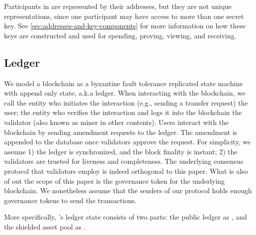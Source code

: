 Participants in \MantaPay{} are represented by their addresses, but they are not unique representations, since one participant may have access to more than one secret key. See \autoref{sec:addresses-and-key-components} for more information on how these keys are constructed and used for spending, proving, viewing, and receiving.

\subsection{Ledger}

We model a blockchain as a byzantine fault tolerance replicated state
machine with append only state, a.k.a ledger. When interacting with the blockchain, we call the entity who
initiates the interaction (e.g., sending a transfer request) the user; the entity who verifies the interaction and
logs it into the blockchain the validator (also known as miner in other contents). Users interact with the
blockchain by sending amendment requests to the ledger. The amendment is appended to the database once
validators approve the request. For simplicity, we assume 1) the ledger is synchronized, and the block finality
is instant; 2) the validators are trusted for liveness and completeness. The underlying consensus protocol
that validators employ is indeed orthogonal to this paper. What is also of out the scope of this paper is
the governance token for the underlying blockchain. We nonetheless assume that the senders of our protocol
holds enough governance tokens to send the transactions.

More specifically, \MantaPay{}'s ledger state \Ledger{} consists of two parts: the public ledger as \PublicLedger{}, and the shielded asset pool as \ShieldedAssetPool{}.

\begin{center}
    \vspace{1em}
    \begin{mdframed}[leftmargin=0.2\textwidth, rightmargin=0.2\textwidth]
        \begin{center}
        \end{center}
    \end{mdframed}
    \vspace{-1em}
\end{center}

